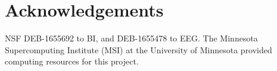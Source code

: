 \documentclass[11pt]{article}
\begin{document}
\vfill

\linenumbers


\clearpage



\clearpage





\section{Acknowledgements}

NSF DEB-1655692 to BI, and DEB-1655478 to EEG.
The Minnesota Supercomputing Institute (MSI) at the University of Minnesota provided computing resources for this project.


\clearpage


\setstretch{\stretchby}
\end{document}
